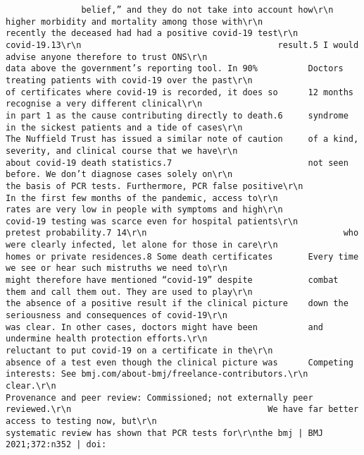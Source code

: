 \documentclass[
]{book}
\begin{document}
\begin{verbatim}
               belief,” and they do not take into account how\r\n                                                                                                   higher morbidity and mortality among those with\r\n                                       recently the deceased had had a positive covid-19 test\r\n                                                                                                   covid-19.13\r\n                                       result.5 I would advise anyone therefore to trust ONS\r\n                                       data above the government’s reporting tool. In 90%          Doctors treating patients with covid-19 over the past\r\n                                       of certificates where covid-19 is recorded, it does so      12 months recognise a very different clinical\r\n                                       in part 1 as the cause contributing directly to death.6     syndrome in the sickest patients and a tide of cases\r\n                                       The Nuffield Trust has issued a similar note of caution     of a kind, severity, and clinical course that we have\r\n                                       about covid-19 death statistics.7                           not seen before. We don’t diagnose cases solely on\r\n                                                                                                   the basis of PCR tests. Furthermore, PCR false positive\r\n                                       In the first few months of the pandemic, access to\r\n                                                                                                   rates are very low in people with symptoms and high\r\n                                       covid-19 testing was scarce even for hospital patients\r\n                                                                                                   pretest probability.7 14\r\n                                       who were clearly infected, let alone for those in care\r\n                                       homes or private residences.8 Some death certificates       Every time we see or hear such mistruths we need to\r\n                                       might therefore have mentioned “covid-19” despite           combat them and call them out. They are used to play\r\n                                       the absence of a positive result if the clinical picture    down the seriousness and consequences of covid-19\r\n                                       was clear. In other cases, doctors might have been          and undermine health protection efforts.\r\n                                       reluctant to put covid-19 on a certificate in the\r\n                                       absence of a test even though the clinical picture was      Competing interests: See bmj.com/about-bmj/freelance-contributors.\r\n                                       clear.\r\n                                                                                                   Provenance and peer review: Commissioned; not externally peer reviewed.\r\n                                       We have far better access to testing now, but\r\n                                       systematic review has shown that PCR tests for\r\nthe bmj | BMJ 2021;372:n352 | doi: 
\end{verbatim}
\end{document}
